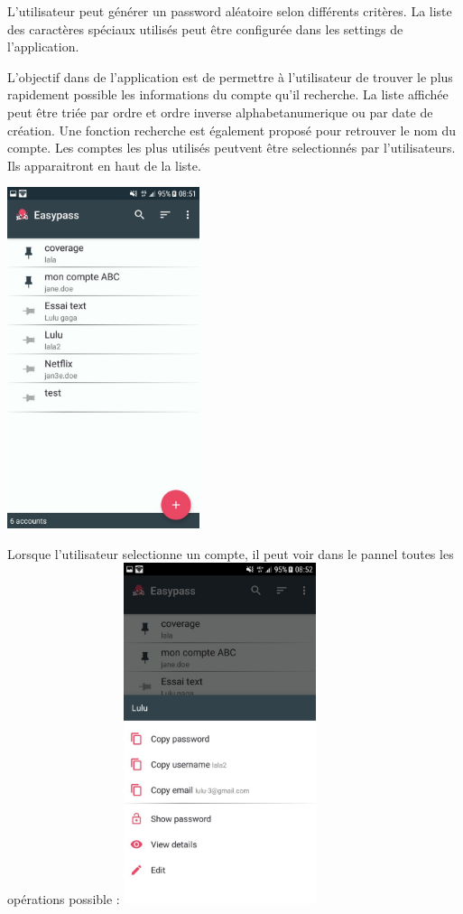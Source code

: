 L'utilisateur peut générer un password aléatoire selon différents critères. La liste des caractères spéciaux utilisés peut être configurée dans les settings de l'application.

 L'objectif dans de l'application \easypass{} est de permettre à l'utilisateur de trouver le plus rapidement possible les informations du compte qu'il recherche. La liste affichée peut être triée par ordre et ordre inverse alphabetanumerique ou par date de création. Une fonction recherche est également proposé pour retrouver le nom du compte. Les comptes les plus utilisés peutvent être selectionnés par l'utilisateurs. Ils apparaitront en haut de la liste. 

\includegraphics[height=10cm]{liste.jpg}

Lorsque l'utilisateur selectionne un compte, il peut voir dans le pannel toutes les opérations possible : 
\includegraphics[height=10cm]{liste-edition.jpg}

